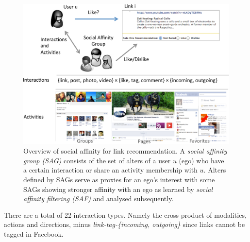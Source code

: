 \begin{figure}[t!]
\centering
\includegraphics[width=1\linewidth]{data/overview}
\caption{Overview of social affinity for link recommendation.
A \emph{social affinity group (SAG)} consists of the set of alters 
of a user $u$ (ego) who have a
certain interaction or share an activity membership with $u$.
Alters defined by SAGs serve as proxies for an ego's interest with some
SAGs showing stronger affinity with an ego as learned by \emph{social affinity filtering (SAF)}
and analysed subsequently.}
\label{fig:overview}
\end{figure}

There are a total of 22 interaction types. Namely the cross-product of modalities, actions and directions, minus {\em link-tag-\{incoming, outgoing\}} since links cannot be tagged in Facebook.




